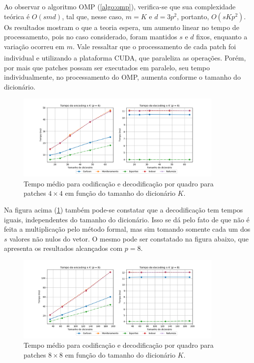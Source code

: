 \documentclass[cic,tc]{iiufrgs}
\newcommand{\reg}{\textsuperscript{\textregistered}}
\begin{document}
Ao observar o algoritmo OMP (\ref{algo:omp}), verifica-se que sua complexidade teórica 
é $O(s m d)$, tal que, nesse caso, $m = K$ e $d = 3p^2$, portanto, $O(s K p^2)$.
Os resultados mostram o que a teoria espera, um aumento linear no tempo de processamento,
pois no caso considerado, foram mantidos $s$ e $d$ fixos, enquanto a variação ocorreu em $m$.
Vale ressaltar que o processamento de cada patch foi individual e utilizando a plataforma 
CUDA\reg, que paraleliza as operações.
Porém, por mais que patches possam ser executados em paralelo, seu tempo individualmente, 
no processamento do OMP, aumenta conforme o tamanho do dicionário.

\begin{figure}[H]
    \caption{Tempo médio para codificação e decodificação por quadro para patches $4\times4$ em função do tamanho do dicionário $K$.}
    \begin{center}
        \includegraphics[width=0.9\textwidth]{img/graficos/p4_ds_edtime.png}
    \end{center}
    \label{fig:timep4}
\end{figure}

Na figura acima (\ref{fig:timep4}) também pode-se constatar que a decodificação tem tempos iguais, independentes
do tamanho do dicionário.
Isso se dá pelo fato de que não é feita a multiplicação pelo método formal, mas sim tomando
somente cada um dos $s$ valores não nulos do vetor.
O mesmo pode ser constatado na figura abaixo, que apresenta os resultados alcançados com $p=8$.

\begin{figure}[H]
    \caption{Tempo médio para codificação e decodificação por quadro para patches $8\times8$ em função do tamanho do dicionário $K$.}
    \begin{center}
        \includegraphics[width=0.9\textwidth]{img/graficos/p8_ds_edtime.png}
    \end{center}
    \label{fig:timep8}
\end{figure}
\end{document}
